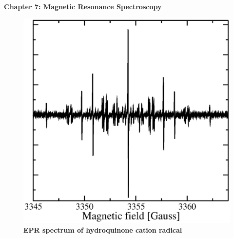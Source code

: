 \renewcommand{\theequation}{7.\arabic{equation}}

\begin{frame}
\begin{center}
{\bf Chapter 7: Magnetic Resonance Spectroscopy}\\
\end{center}

\begin{figure}
\centering
\includegraphics[scale=0.3]{figs/quinone}\\
\hspace{0.8cm}\textbf{\tiny{EPR spectrum of hydroquinone cation radical}}
\end{figure}
\end{frame}

\scriptsize






